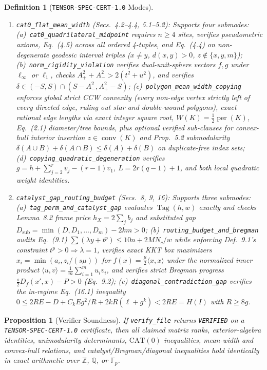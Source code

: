 \documentclass[10pt,twocolumn]{article}
\newtheorem{definition}{Definition}
\newtheorem{proposition}{Proposition}
\begin{document}
{\begin{definition}[\texttt{TENSOR-SPEC-CERT-1.0} Modes]
\begin{enumerate}[leftmargin=*,itemsep=1.5pt,topsep=2pt]
\item \texttt{cat0\_flat\_mean\_width} (Secs.~4.2--4.4, 5.1--5.2): Supports four submodes: (a)~\texttt{cat0\_quadrilateral\_midpoint} requires $n\ge 4$ sites, verifies pseudometric axioms, Eq.~(4.5) across all ordered 4-tuples, and Eq.~(4.4) on non-degenerate geodesic interval triples ($x\ne y$, $d(x,y)>0$, $z\notin\{x,y,m\}$); (b)~\texttt{norm\_rigidity\_violation} verifies dual-unit-sphere vectors $f,g$ under $\ell_\infty$ or $\ell_1$, checks $A_+^2+A_-^2 > 2(t^2+u^2)$, and verifies $\delta \in (-S,S)\cap (S-A_-^2, A_+^2-S)$; (c)~\texttt{polygon\_mean\_width\_copying} enforces global strict CCW convexity (every non-edge vertex strictly left of every directed edge, ruling out star and double-wound polygons), exact rational edge lengths via exact integer square root, $W(K)=\frac{1}{2}\operatorname{per}(K)$, Eq.~(2.1) diameter/tree bounds, plus optional verified sub-clauses for convex-hull interior insertion $z\in\operatorname{conv}(K)$ and Prop.~5.2 submodularity $\delta(A\cup B)+\delta(A\cap B)\le\delta(A)+\delta(B)$ on duplicate-free index sets; (d)~\texttt{copying\_quadratic\_degeneration} verifies $g=h+\sum_{j=2}^r v_j-(r-1)v_1$, $L=2r(q-1)+1$, and both local quadratic weight identities.
\item \texttt{catalyst\_gap\_\allowbreak routing\_budget} (Secs.~8, 9, 16): Supports three submodes: (a)~\texttt{tag\_perm\_and\_catalyst\_gap} evaluates $\operatorname{Tag}(h,w)$ exactly and checks Lemma~8.2 frame price $h_X=2\sum_j b_j$ and substituted gap $D_{\mathrm{sub}}=\min(D,D_1,\dots,D_m)-2km > 0$; (b)~\texttt{routing\_budget\_and\_bregman} audits Eq.~(9.1) $\sum (\lambda y + t^p) \le 10n + 2MN_c/w$ while enforcing Def.~9.1's constraint $t^p > 0 \Rightarrow \lambda = 1$, verifies exact KKT box maximizers $x_i = \min(a_i, z_i/(s\mu))$ for $f(x)=\frac{\mu}{2}\langle x,x\rangle$ under the normalized inner product $\langle u,v\rangle = \frac{1}{m}\sum_{i=1}^m u_i v_i$, and verifies strict Bregman progress $\frac{s}{2}D_f(x',x)-P > 0$ (Eq.~9.2); (c)~\texttt{diagonal\_contradiction\_gap} verifies the in-regime Eq.~(16.1) inequality $0 \le 2RE - D + C_k E g^2/R + 2kR(\ell+g^k) < 2RE = H(I)$ with $R\ge 8g$.
\end{enumerate}
\end{definition}
}

\begin{proposition}[Verifier Soundness]
If \texttt{verify\_file} returns \texttt{VERIFIED} on a \texttt{TENSOR-SPEC-CERT-1.0} certificate, then all claimed matrix ranks, exterior-algebra identities, unimodularity determinants, $\mathrm{CAT}(0)$ inequalities, mean-width and convex-hull relations, and catalyst/Bregman/diagonal inequalities hold identically in exact arithmetic over $\mathbb{Z}$, $\mathbb{Q}$, or $\mathbb{F}_p$.
\end{proposition}
\end{document}
